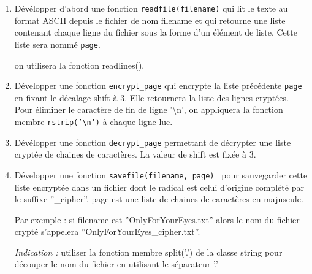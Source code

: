 \documentclass[a4paper, 12pt]{article}
\begin{document}
\begin{enumerate} 
\item Dévélopper d'abord une fonction {\tt readfile(filename)} qui lit le texte au format ASCII depuis le fichier de nom filename
et qui retourne une liste contenant chaque ligne du fichier sous la forme d'un élément de liste. 
Cette liste sera nommé {\tt page}.

 on utilisera la fonction readlines().

\item Développer une fonction {\tt encrypt\_page} qui encrypte la liste précédente {\tt page} en fixant le décalage shift à 3. 
Elle retournera la liste des lignes cryptées.
Pour éliminer le caractère de fin de ligne '\textbackslash n', on appliquera la fonction membre {\tt rstrip('\textbackslash n')} à chaque ligne lue.

\item Dévélopper une fonction {\tt decrypt\_page} permettant de décrypter une liste cryptée de chaines de caractères.
La valeur de shift est fixée à 3.

\item Développer une fonction {\tt savefile(filename, page) } pour sauvegarder cette liste encryptée dans un fichier 
dont le radical est celui d'origine complété par le suffixe ''\_cipher''.
page est une liste de chaines de caractères en majuscule.

\noindent Par exemple : si filename est ''OnlyForYourEyes.txt'' alors le nom du fichier crypté s'appelera ''OnlyForYourEyes\_cipher.txt''.

{\it Indication :} utiliser la fonction membre split('.') de la classe string pour découper le nom du fichier en utilisant le séparateur '.'



\end{enumerate} 
\end{document}

